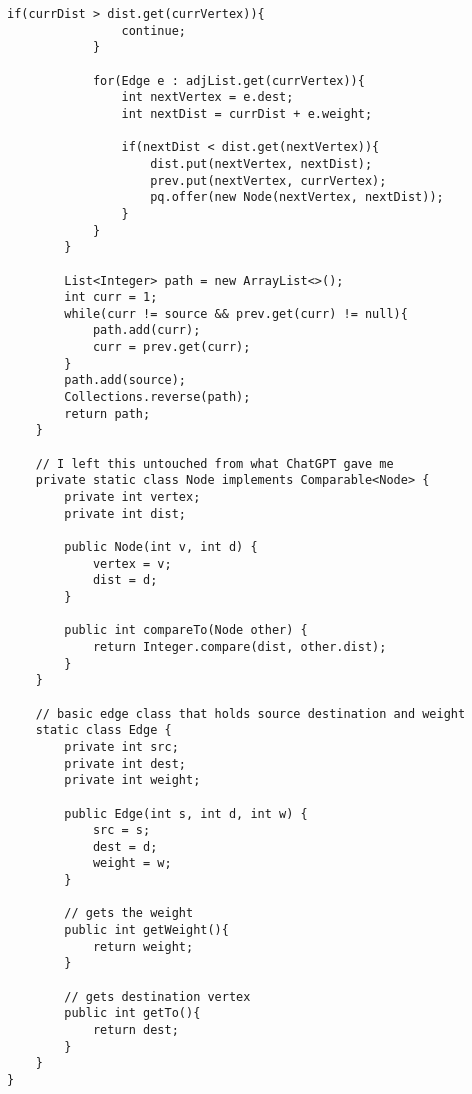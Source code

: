\documentclass[10pt]{article}
\begin{document}
\begin{lstlisting}[frame=single, ]
            if(currDist > dist.get(currVertex)){
                continue;
            }
            
            for(Edge e : adjList.get(currVertex)){
                int nextVertex = e.dest;
                int nextDist = currDist + e.weight;
                
                if(nextDist < dist.get(nextVertex)){
                    dist.put(nextVertex, nextDist);
                    prev.put(nextVertex, currVertex);
                    pq.offer(new Node(nextVertex, nextDist));
                }
            }
        }
        
        List<Integer> path = new ArrayList<>();
        int curr = 1;
        while(curr != source && prev.get(curr) != null){
            path.add(curr);
            curr = prev.get(curr);
        }
        path.add(source);
        Collections.reverse(path);
        return path;
    }
    
    // I left this untouched from what ChatGPT gave me
    private static class Node implements Comparable<Node> {
        private int vertex;
        private int dist;
        
        public Node(int v, int d) {
            vertex = v;
            dist = d;
        }
        
        public int compareTo(Node other) {
            return Integer.compare(dist, other.dist);
        }
    }
    
    // basic edge class that holds source destination and weight
    static class Edge {
        private int src;
        private int dest;
        private int weight;
        
        public Edge(int s, int d, int w) {
            src = s;
            dest = d;
            weight = w;
        }

        // gets the weight
        public int getWeight(){
            return weight;
        }

        // gets destination vertex
        public int getTo(){
            return dest;
        }
    }
}
\end{lstlisting}
\end{document}
